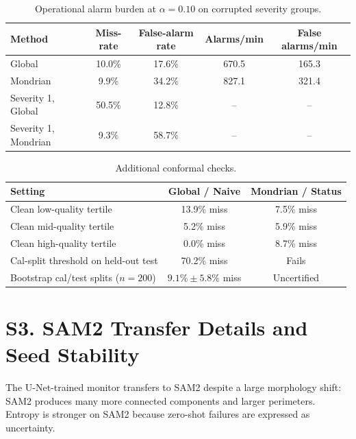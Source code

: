 \documentclass[9pt]{article}
\newcommand{\unet}{U-Net}
\begin{document}
\begin{table}[h]
\centering
\scriptsize
\setlength{\tabcolsep}{4pt}
\caption{Operational alarm burden at $\alpha=0.10$ on corrupted severity groups.}
\label{tab:supp_alarm}
\begin{tabular}{lcccc}
\toprule
Method & Miss-rate & False-alarm rate & Alarms/min & False alarms/min \\
\midrule
Global & 10.0\% & 17.6\% & 670.5 & 165.3 \\
Mondrian & 9.9\% & 34.2\% & 827.1 & 321.4 \\
Severity 1, Global & 50.5\% & 12.8\% & -- & -- \\
Severity 1, Mondrian & 9.3\% & 58.7\% & -- & -- \\
\bottomrule
\end{tabular}
\end{table}

\begin{table}[h]
\centering
\scriptsize
\setlength{\tabcolsep}{6pt}
\caption{Additional conformal checks.}
\label{tab:supp_conformal}
\begin{tabular}{lcc}
\toprule
Setting & Global / Naive & Mondrian / Status \\
\midrule
Clean low-quality tertile & 13.9\% miss & 7.5\% miss \\
Clean mid-quality tertile & 5.2\% miss & 5.9\% miss \\
Clean high-quality tertile & 0.0\% miss & 8.7\% miss \\
Cal-split threshold on held-out test & 70.2\% miss & Fails \\
Bootstrap cal/test splits ($n=200$) & $9.1\%\pm5.8\%$ miss & Uncertified \\
\bottomrule
\end{tabular}
\end{table}

\section*{S3. SAM2 Transfer Details and Seed Stability}

The \unet{}-trained monitor transfers to SAM2 despite a large morphology shift:
SAM2 produces many more connected components and larger perimeters. Entropy is
stronger on SAM2 because zero-shot failures are expressed as uncertainty.
\end{document}
